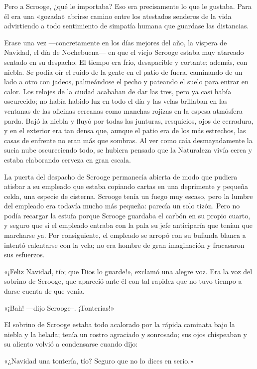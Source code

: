 \documentclass{novela}
\begin{document}
 Pero a Scrooge, ¿qué le importaba? Eso era precisamente lo que le gustaba. Para él era una «gozada» abrirse camino entre los atestados senderos de la vida advirtiendo a todo sentimiento de simpatía humana que guardase las distancias.

 Erase una vez ---concretamente en los días mejores del año, la víspera de Navidad, el día de Nochebuena--- en que el viejo Scrooge estaba muy atareado sentado en su despacho. El tiempo era frío, desapacible y cortante; además, con niebla. Se podía oír el ruido de la gente en el patio de fuera, caminando de un lado a otro con jadeos, palmeándose el pecho y pateando el suelo para entrar en calor. Los relojes de la ciudad acababan de dar las tres, pero ya casi había oscurecido; no había habido luz en todo el día y las velas brillaban en las ventanas de las oficinas cercanas como manchas rojizas en la espesa atmósfera parda. Bajó la niebla y fluyó por todas las junturas, resquicios, ojos de cerradura, y en el exterior era tan densa que, aunque el patio era de los más estrechos, las casas de enfrente no eran más que sombras. Al ver como caía desmayadamente la sucia nube oscureciendo todo, se hubiera pensado que la Naturaleza vivía cerca y estaba elaborando cerveza en gran escala.

 La puerta del despacho de Scrooge permanecía abierta de modo que pudiera atisbar a su empleado que estaba copiando cartas en una deprimente y pequeña celda, una especie de cisterna. Scrooge tenía un fuego muy escaso, pero la lumbre del empleado era todavía mucho más pequeña: parecía un solo tizón. Pero no podía recargar la estufa porque Scrooge guardaba el carbón en su propio cuarto, y seguro que si el empleado entraba con la pala su jefe anticiparía que tenían que marcharse ya. Por consiguiente, el empleado se arropó con su bufanda blanca a intentó calentarse con la vela; no era hombre de gran imaginación y fracasaron sus esfuerzos.

 «¡Feliz Navidad, tío; que Dios lo guarde!», exclamó una alegre voz. Era la voz del sobrino de Scrooge, que apareció ante él con tal rapidez que no tuvo tiempo a darse cuenta de que venía.

 «¡Bah! ---dijo Scrooge--. ¡Tonterías!»

 El sobrino de Scrooge estaba todo acalorado por la rápida caminata bajo la niebla y la helada; tenía un rostro agraciado y sonrosado; sus ojos chispeaban y su aliento volvió a condensarse cuando dijo:

 «¿Navidad una tontería, tío? Seguro que no lo dices en serio.»
\end{document}
